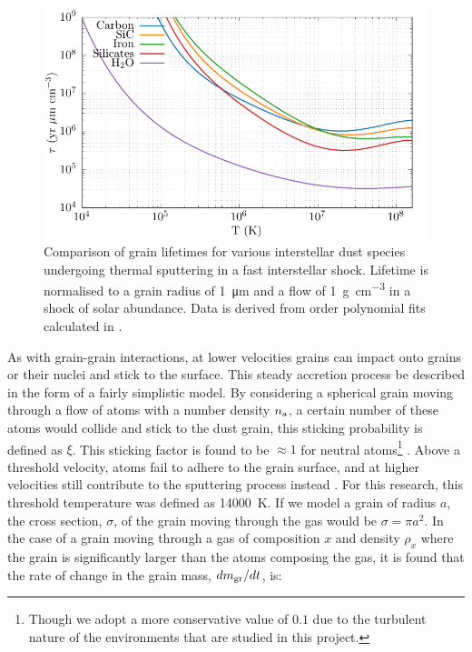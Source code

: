 \begin{figure}
  \centering
  \includegraphics{assets/tielens-sputtering/sputter.pdf}
  \caption[Grain lifetime comparison]{Comparison of grain lifetimes for various interstellar dust species undergoing thermal sputtering in a fast interstellar shock. Lifetime is normalised to a grain radius of \SI{1}{\micro\metre} and a flow of \SI{1}{\gram\per\centi\metre\cubed} in a shock of solar abundance. Data is derived from  order polynomial fits calculated in \textcite[Table~4]{tielens_physics_1994}.}
  \label{fig:grain-lifespan}
\end{figure}

As with grain-grain interactions, at lower velocities grains can impact onto grains or their nuclei and stick to the surface.
This steady accretion process be described in the form of a fairly simplistic model.
By considering a spherical grain moving through a flow of atoms with a number density $n_\text{a}$, a certain number of these atoms would collide and stick to the dust grain, this sticking probability is defined as $\xi$.
This sticking factor is found to be $\approx 1$ for neutral atoms\footnote{Though we adopt a more conservative value of $0.1$ due to the turbulent nature of the environments that are studied in this project.} \parencite{watsonAbundancesInterstellarMolecules1972}.
Above a threshold velocity, atoms fail to adhere to the grain surface, and at higher velocities still contribute to the sputtering process instead \parencite{spitzerPhysicalProcessesInterstellar2008}.
For this research, this threshold temperature was defined as \SI{14000}{\kelvin}.
If we model a grain of radius $a$, the cross section, $\sigma$, of the grain moving through the gas would be $\sigma = \pi a^2$.
In the case of a grain moving through a gas of composition $x$ and density $\rho_x$ where the grain is significantly larger than the atoms composing the gas, it is found that the rate of change in the grain mass, $dm_\text{gr}/dt$, is:

